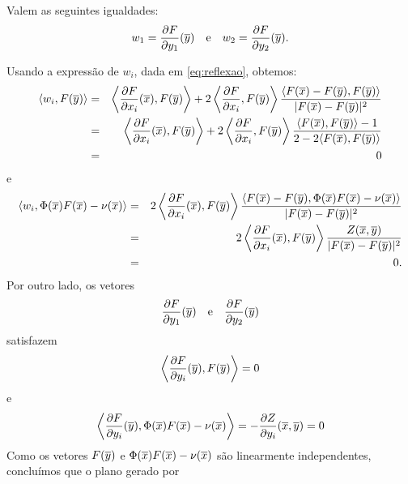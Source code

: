 \begin{lema} \label{lem:w_1 w_2}
Valem as seguintes igualdades:
\begin{equation*}
w_1 = \frac{\partial F}{\partial y_1}(\overline{y}) 
\quad \text{e} \quad 
w_2 = \frac{\partial F}{\partial y_2}(\overline{y}).
\end{equation*}
\end{lema}
\begin{demonstracao}
Usando a express\~ao de $w_i$, dada em \eqref{eq:reflexao}, obtemos:
\begin{eqnarray*}
\langle w_i, F(\overline{y}) \rangle &=& \left\langle \frac{\partial F}{\partial x_i}(\overline{x}), F(\overline{y}) \right\rangle + 2 \left\langle \frac{\partial F}{\partial x_i}, F(\overline{y}) \right\rangle \frac{\langle F(\overline{x}) - F(\overline{y}),F(\overline{y}) \rangle}{| F(\overline{x}) - F(\overline{y}) |^2} \\
&=& \left\langle \frac{\partial F}{\partial x_i}(\overline{x}), F(\overline{y}) \right\rangle 
+ 2 \left\langle \frac{\partial F}{\partial x_i}, F(\overline{y}) \right\rangle \frac{\langle F(\overline{x}),F(\overline{y}) \rangle - 1}{2 - 2 \langle F(\overline{x}), F(\overline{y}) \rangle} \\
&=& 0
\end{eqnarray*}
e
\begin{eqnarray*}
\langle w_i, \Phi(\overline{x}) F(\overline{x}) - \nu(\overline{x}) \rangle &=&
2 \left\langle \frac{\partial F}{\partial x_i}(\overline{x}), F(\overline{y}) \right\rangle \frac{\langle F(\overline{x}) - F(\overline{y}), \Phi(\overline{x}) F(\overline{x}) - \nu(\overline{x}) \rangle}{| F(\overline{x}) - F(\overline{y}) |^2} \\
& = & 2 \left\langle \frac{\partial F}{\partial x_i}(\overline{x}), F(\overline{y}) \right\rangle \frac{Z(\overline{x},\overline{y})}{| F(\overline{x}) - F(\overline{y}) |^2} \\
& = & 0.
\end{eqnarray*}
Por outro lado, os vetores
\begin{equation*}
\frac{\partial F}{\partial y_1}(\overline{y}) \quad \text{e} \quad \frac{\partial F}
{\partial y_2}(\overline{y})
\end{equation*}
satisfazem
\begin{equation*}
\left\langle \frac{\partial F}{\partial y_i}(\overline{y}), F(\overline{y})\right\rangle = 0
\end{equation*}
e
\begin{equation*}
\left\langle \frac{\partial F}{\partial y_i}(\overline{y}), \Phi(\overline{x}) F(\overline{x}) - 
\nu(\overline{x}) \right\rangle = -\frac{\partial Z}{\partial y_i}(\overline{x},\overline{y}) 
= 0
\end{equation*}
Como os vetores $F(\overline{y})$ e $ \Phi(\overline{x}) F(\overline{x}) - \nu(\overline{x})$
são linearmente independentes, conclu\'imos que o plano gerado por
\begin{equation*}

\end{equation*}
\end{demonstracao}
